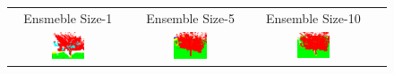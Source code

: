     \begin{figure}[h!]
        \begin{tabular}{cccc}
            Ensmeble Size-1 & Ensemble Size-5 & Ensemble Size-10 \\
            \includegraphics[width=0.30\textwidth, height=0.15\textheight]{images/seg_output/deep_ensembles/1_1.pdf} &
            \includegraphics[width=0.30\textwidth, height=0.15\textheight]{images/seg_output/deep_ensembles/1_5.pdf}& 
            \includegraphics[width=0.30\textwidth, height=0.15\textheight]{images/seg_output/deep_ensembles/1_10.pdf}\\


\end{tabular}
\end{figure}
